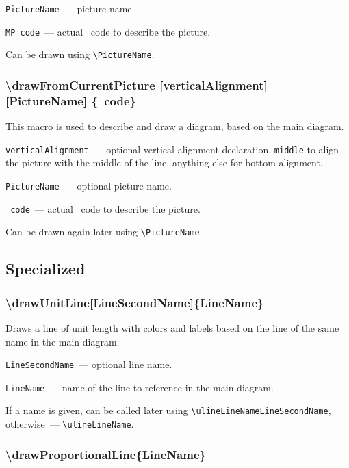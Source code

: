 	\texttt{PictureName}~— picture name.

	\texttt{MP code}~— actual \METAPOST\ code to describe the picture.
	
	Can be drawn using \texttt{\textbackslash PictureName}.
	
\sloppy

\subsubsection{\textbackslash drawFromCurrentPicture [verticalAlignment] [PictureName] \{\METAPOST\nolinebreak\ code\}}
 
 \fussy
  
	This macro is used to describe and draw a diagram, based on the main diagram.

	\texttt{verticalAlignment}~— optional vertical alignment declaration. \texttt{middle} to align the picture with the middle of the line, anything else for bottom alignment.

	\texttt{PictureName}~— optional picture name.

	\texttt{\METAPOST\ code}~— actual \METAPOST\ code to describe the picture.
	
	Can be drawn again later using \texttt{\textbackslash PictureName}.


\subsection{Specialized}

\subsubsection{\textbackslash drawUnitLine[LineSecondName]\{LineName\}}

	Draws a line of unit length with colors and labels based on the line of the same name in the main diagram.

	\texttt{LineSecondName}~— optional line name.
	
	\texttt{LineName}~— name of the line to reference in the main diagram. 

	If a name is given, can be called later using \texttt{\textbackslash ulineLineNameLineSecondName}, otherwise~— \texttt{\textbackslash ulineLineName}. 

\subsubsection{\textbackslash drawProportionalLine\{LineName\}}

